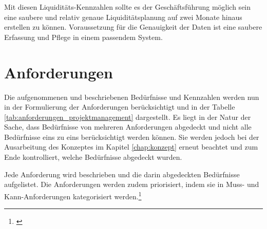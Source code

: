 Mit diesen Liquiditäts-Kennzahlen sollte es der Geschäftsführung möglich sein
eine saubere und relativ genaue Liquiditätsplanung auf zwei Monate hinaus
erstellen zu können. Voraussetzung für die Genauigkeit der Daten ist eine
saubere Erfassung und Pflege in einem passendem System.

\clearpage

\section{Anforderungen}
Die aufgenommenen und beschriebenen Bedürfnisse und Kennzahlen werden nun in der Formulierung
der Anforderungen berücksichtigt und in der Tabelle \ref{tab:anforderungen_projektmanagement} 
dargestellt. Es liegt in der Natur der Sache, dass Bedürfnisse von mehreren 
Anforderungen abgedeckt und nicht alle Bedürfnisse eins zu eins berücksichtigt 
werden können. Sie werden jedoch bei der Ausarbeitung des Konzeptes im Kapitel \ref{chap:konzept}
erneut beachtet und zum Ende kontrolliert, welche Bedürfnisse abgedeckt wurden.

Jede Anforderung wird beschrieben und die darin abgedeckten Bedürfnisse aufgelistet. 
Die Anforderungen werden zudem priorisiert, indem sie in Muss- und Kann-Anforderungen 
kategorisiert werden.\footnote{\citealp*[Vgl.][S. 32]{hobel2006gabler}}

